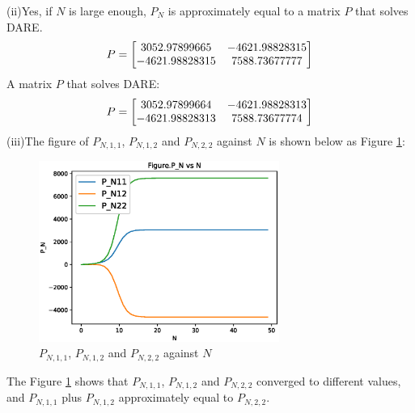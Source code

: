 \documentclass[a4paper,11pt,reqno]{amsart}
\begin{document}
(ii)Yes, if $N$ is large enough, $P_N$ is approximately equal to a matrix $P$ that solves DARE.
\begin{equation}
    P =
    \begin{bmatrix}
        3052.97899665 & -4621.98828315 \\
        -4621.98828315 & 7588.73677777
    \end{bmatrix}
    \notag
\end{equation}
A matrix $P$ that solves DARE:
\begin{equation}
    P =
    \begin{bmatrix}
        3052.97899664 & -4621.98828313 \\
        -4621.98828313 & 7588.73677774
    \end{bmatrix}
    \notag
\end{equation}
(iii)The figure of $P_{N,1,1}$, $P_{N,1,2}$ and $P_{N,2,2}$ against $N$ is shown below as Figure \ref{fig:q2_iii}:
\begin{figure}[H]
    \centering
    \includegraphics[width=0.7\textwidth]{figures/q2_iii.eps}
    \caption{$P_{N,1,1}$, $P_{N,1,2}$ and $P_{N,2,2}$ against $N$}
    \label{fig:q2_iii}
\end{figure}
The Figure \ref{fig:q2_iii} shows that $P_{N,1,1}$, $P_{N,1,2}$ and $P_{N,2,2}$ converged to different values, and $P_{N,1,1}$ plus $P_{N,1,2}$ approximately equal to $P_{N,2,2}$.
\\
\end{document}
